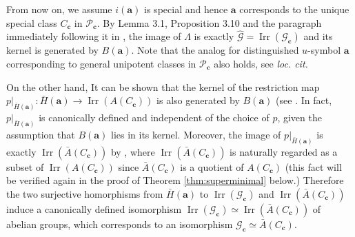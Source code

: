 \documentclass{amsart}
\theoremstyle{definition}
\DeclareMathOperator{\Irr}{Irr}
\newcommand{\cG}{\mathcal{G}}
\newcommand{\cP}{\mathcal{P}}
\newcommand{\cT}{\mathcal{T}}
\newcommand{\ba}{\mathbf{a}}
\newcommand{\bc}{{\mathbf{c}}}
\newcommand{\Ab}{\bar{A}}
\newcommand{\Ib}{\bar{I}}
\newcommand{\Hb}{\bar{H}}
\newcommand{\0}{\mathcal{O}}
\begin{document}
From now on, we assume $i(\ba)$ is special and hence $\ba$ corresponds to the unique special class $C_\bc$ in $\cP_\bc$.
By Lemma 3.1, Proposition 3.10 and the paragraph immediately following it in \cite{Achar-Sage-special}, the image of $\Lambda$ is exactly $\hat{\cG} = \Irr(\cG_\bc)$ and its kernel is generated by $B(\ba)$. Note that the analog for distinguished $u$-symbol $\ba$ corresponding to general unipotent classes in $\cP_\bc$ also holds, see \emph{loc. cit.}


On the other hand, It can be shown that the kernel of the restriction map $p|_{\Hb(\ba)}: \Hb(\ba) \to \Irr(A(C_\bc))$ is also generated by $B(\ba)$ (see \cite[Prop. 3.13]{Achar-Sage-special}. In fact, $p|_{\Hb(\ba)}$ is canonically defined and independent of the choice of $p$, given the assumption that $B(\ba)$ lies in its kernel. Moreover, the image of $p|_{\Hb(\ba)}$ is exactly $\Irr(\Ab(C_\bc))$ by \cite[Prop. 3.14]{Achar-Sage-special}, where $\Irr(\Ab(C_\bc))$ is naturally regarded as a subset of $\Irr(A(C_\bc))$ since $\Ab(C_\bc)$ is a quotient of $A(C_\bc)$ (this fact will be verified again in the proof of Theorem \ref{thm:superminimal} below.)  Therefore the two surjective homorphisms from $\Hb(\ba)$ to $\Irr(\cG_\bc)$ and $\Irr(\Ab(C_\bc))$ induce a canonically defined isomorphism $ \Irr(\cG_\bc) \simeq \Irr(\Ab(C_\bc))$ of abelian groups, which corresponds to an isomorphism $\cG_\bc \simeq \Ab(C_\bc)$. 

\end{document}
